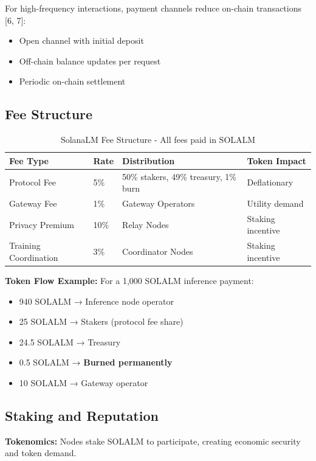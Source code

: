 \documentclass[11pt,a4paper]{article}
\begin{document}
For high-frequency interactions, payment channels reduce on-chain transactions [6, 7]:

\begin{itemize}
    \item Open channel with initial deposit
    \item Off-chain balance updates per request
    \item Periodic on-chain settlement
\end{itemize}

\subsection{Fee Structure}

\begin{table}[H]
\centering
\begin{tabular}{@{}llll@{}}
\toprule
\textbf{Fee Type} & \textbf{Rate} & \textbf{Distribution} & \textbf{Token Impact} \\
\midrule
Protocol Fee & 5\% & 50\% stakers, 49\% treasury, 1\% burn & Deflationary \\
Gateway Fee & 1\% & Gateway Operators & Utility demand \\
Privacy Premium & 10\% & Relay Nodes & Staking incentive \\
Training Coordination & 3\% & Coordinator Nodes & Staking incentive \\
\bottomrule
\end{tabular}
\caption{SolanaLM Fee Structure - All fees paid in SOLALM}
\end{table}

\textbf{Token Flow Example:} For a 1,000 SOLALM inference payment:
\begin{itemize}
    \item 940 SOLALM → Inference node operator
    \item 25 SOLALM → Stakers (protocol fee share)
    \item 24.5 SOLALM → Treasury
    \item 0.5 SOLALM → \textbf{Burned permanently}
    \item 10 SOLALM → Gateway operator
\end{itemize}

\subsection{Staking and Reputation}

\textbf{Tokenomics:} Nodes stake SOLALM to participate, creating economic security and token demand.
\end{document}
